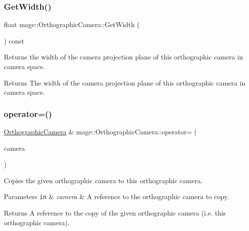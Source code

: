 \subsubsection{\texorpdfstring{Get\+Width()}{GetWidth()}}
{\footnotesize\ttfamily float mage\+::\+Orthographic\+Camera\+::\+Get\+Width (\begin{DoxyParamCaption}{ }\end{DoxyParamCaption}) const\hspace{0.3cm}{\ttfamily [noexcept]}}

Returns the width of the camera projection plane of this orthographic camera in camera space.

\begin{DoxyReturn}{Returns}
The width of the camera projection plane of this orthographic camera in camera space. 
\end{DoxyReturn}
\hypertarget{classmage_1_1_orthographic_camera_ac4a319517ed3b9708028e555660b23aa}{}\label{classmage_1_1_orthographic_camera_ac4a319517ed3b9708028e555660b23aa} 
\subsubsection{\texorpdfstring{operator=()}{operator=()}\hspace{0.1cm}{\footnotesize\ttfamily [1/2]}}
{\footnotesize\ttfamily \hyperlink{classmage_1_1_orthographic_camera}{Orthographic\+Camera} \& mage\+::\+Orthographic\+Camera\+::operator= (\begin{DoxyParamCaption}\item[{const \hyperlink{classmage_1_1_orthographic_camera}{Orthographic\+Camera} \&}]{camera }\end{DoxyParamCaption})\hspace{0.3cm}{\ttfamily [default]}}

Copies the given orthographic camera to this orthographic camera.


\begin{DoxyParams}[1]{Parameters}
\mbox{\tt in}  & {\em camera} & A reference to the orthographic camera to copy. \\
\hline
\end{DoxyParams}
\begin{DoxyReturn}{Returns}
A reference to the copy of the given orthographic camera (i.\+e. this orthographic camera). 
\end{DoxyReturn}
\hypertarget{classmage_1_1_orthographic_camera_a7fc303921e07ae18dd6fb7e9b7812847}{}\label{classmage_1_1_orthographic_camera_a7fc303921e07ae18dd6fb7e9b7812847} 
